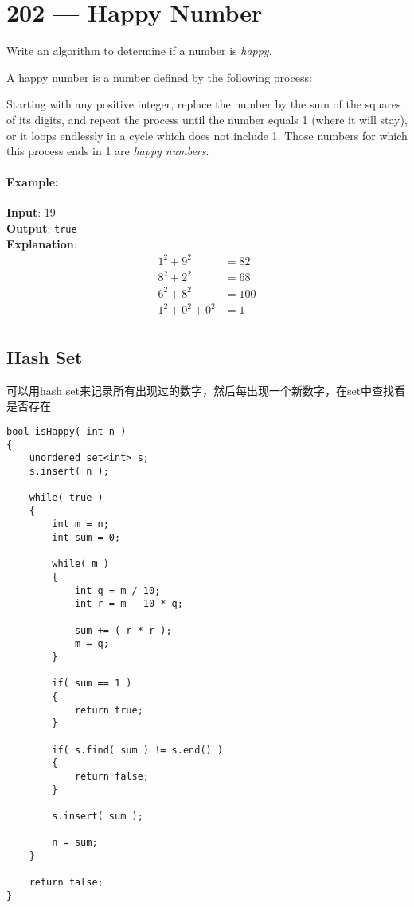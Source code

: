 \section{202 --- Happy Number}
Write an algorithm to determine if a number is \textit{happy}.
\par
A happy number is a number defined by the following process: 
\par
Starting with any positive integer, replace the number by the sum of the squares of its digits, and repeat the process until the number equals 1 (where it will stay), or it loops endlessly in a cycle which does not include 1. Those numbers for which this process ends in 1 are \textit{happy numbers}.
\paragraph{Example: }
\begin{flushleft}

\textbf{Input}: 19
\\
\textbf{Output}: \texttt{true}
\\
\textbf{Explanation}: 
\begin{align*}
1^2 + 9^2 &= 82\\
8^2 + 2^2 &= 68\\
6^2 + 8^2 &= 100\\
1^2 + 0^2 + 0^2 &= 1\\
\end{align*}
\end{flushleft}
\subsection{Hash Set}
\begin{CJK*}{UTF8}{gbsn}
可以用hash set来记录所有出现过的数字，然后每出现一个新数字，在set中查找看是否存在
\end{CJK*}
\setcounter{lstlisting}{0}
\begin{lstlisting}[style=customc, caption={Hash Set}]
bool isHappy( int n )
{
    unordered_set<int> s;
    s.insert( n );

    while( true )
    {
        int m = n;
        int sum = 0;

        while( m )
        {
            int q = m / 10;
            int r = m - 10 * q;

            sum += ( r * r );
            m = q;
        }

        if( sum == 1 )
        {
            return true;
        }

        if( s.find( sum ) != s.end() )
        {
            return false;
        }

        s.insert( sum );

        n = sum;
    }

    return false;
}

\end{lstlisting}
